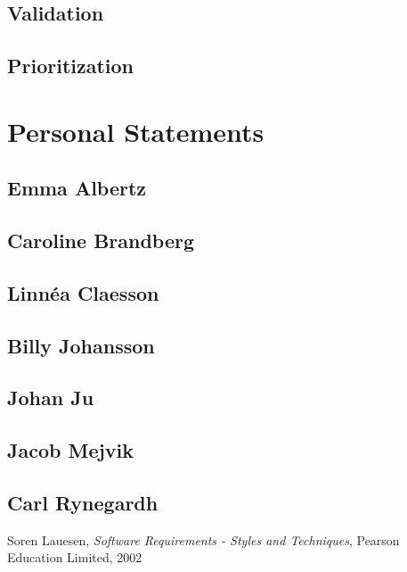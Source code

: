\documentclass[10pt,a4paper]{article}
\begin{document}
\subsection{Validation}

\subsection{Prioritization}

\section{Personal Statements}

\subsection{Emma Albertz}

\subsection{Caroline Brandberg}

\subsection{Linn\'ea Claesson}

\subsection{Billy Johansson}

\subsection{Johan Ju}

\subsection{Jacob Mejvik}

\subsection{Carl Rynegardh}

\begin{thebibliography}{99}
	Soren Lauesen,
  	\emph{Software Requirements - Styles and Techniques},
  	Pearson Education Limited, 2002


\end{thebibliography}
\end{document}
